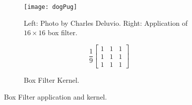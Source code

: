 \begin{figure}[H]
  \centering
  \begin{subfigure}[b]{0.75\textwidth}
    \centering\texttt{[image: dogPug]}
    \caption{Left: Photo by Charles Deluvio. Right: Application of $16\times16$ box filter.}
    \label{fig:roughDog}
  \end{subfigure}
  \begin{subfigure}[b]{0.25\textwidth}
    \centering
    \[
      \frac{1}{9}
    \begin{bmatrix}
       1 & 1 & 1 \\
       1 & 1 & 1 \\
       1 & 1 & 1
    \end{bmatrix}
    \]
    \caption{Box Filter Kernel.}
    \label{fig:boxkernel}
  \end{subfigure}
  \caption{Box Filter application and kernel.}
  \label{fig:boxfilter}
\end{figure}






